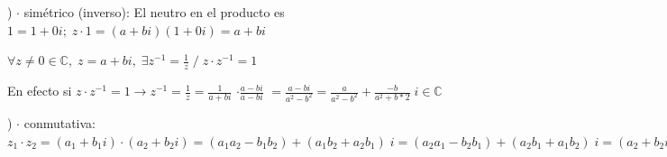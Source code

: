 \begin{proofw}
) $\cdot$ simétrico (inverso): El neutro en el producto es $1=1+0i; \; z\cdot 1 =(a+bi)(1+0i)=a+bi$

$\forall z\neq 0 \in \mathbb C, \; z=a+bi, \; \exists z^{-1}=\frac 1 z\; / \; z\cdot z^{-1}=1$

En efecto si $z\cdot z^{-1}=1 \to z^{-1}= \frac 1 z = \frac {1}{a+bi}$
\textcolor{gris}{$\cdot \frac {a-bi}{a-bi}$}
$= \frac {a-bi}{a^2-b^2}= \frac {a}{a^2-b^2} + \frac {-b}{a^2+b*2} \; i \in \mathbb C$

) $\cdot$ conmutativa: $z_1\cdot z_2=(a_1+b_1i)\cdot(a_2+b_2 i)=(a_1a_2-b_1b_2)+(a_1b_2+a_2b_1)\;i = (a_2a_1-b_2b_1)+(a_2b_1+a_1b_2)\;i= (a_2+b_2i)\cdot (a_1+b_1i)=z_2\cdot z_1$

\end{proofw}



